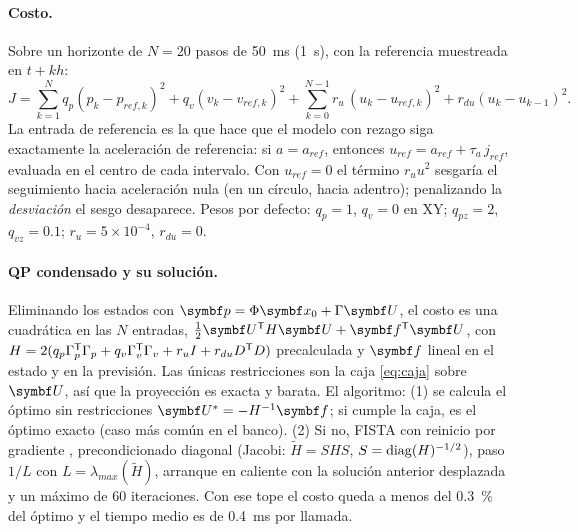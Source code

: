 \paragraph{Costo.} Sobre un horizonte de $N=20$ pasos de 50~ms (1~s), con la
referencia muestreada en $t+kh$:
\begin{equation}
J=\sum_{k=1}^{N}q_p(p_k-p_{ref,k})^2+q_v(v_k-v_{ref,k})^2
+\sum_{k=0}^{N-1}r_u\,(u_k-u_{ref,k})^2+r_{du}(u_k-u_{k-1})^2 .
\label{eq:mpc_cost}
\end{equation}
La entrada de referencia es la que hace que el modelo con rezago siga
exactamente la aceleración de referencia: si $a=a_{ref}$, entonces
$u_{ref}=a_{ref}+\tau_a\,j_{ref}$, evaluada en el centro de cada intervalo.
Con $u_{ref}=0$ el término $r_uu^2$ sesgaría el seguimiento hacia
aceleración nula (en un círculo, hacia adentro); penalizando la
\emph{desviación} el sesgo desaparece. Pesos por defecto: $q_p=1$, $q_v=0$
en XY; $q_{pz}=2$, $q_{vz}=0.1$; $r_u=5\times10^{-4}$, $r_{du}=0$.

\paragraph{QP condensado y su solución.} Eliminando los estados con
$\vect p=\Phi\vect x_0+\Gamma\vect U$, el costo es una cuadrática en las $N$
entradas, $\tfrac12\vect U\T H\vect U+\vect f\T\vect U$, con
$H=2(q_p\Gamma_p^{\mathsf{T}}\Gamma_p+q_v\Gamma_v^{\mathsf{T}}\Gamma_v+r_uI+r_{du}D^{\mathsf{T}} D)$ precalculada y
$\vect f$ lineal en el estado y en la previsión. Las únicas restricciones son
la caja \eqref{eq:caja} sobre $\vect U$, así que la proyección es exacta y
barata. El algoritmo: (1) se calcula el óptimo sin restricciones
$\vect U^*=-H^{-1}\vect f$; si cumple la caja, es el óptimo exacto (caso más
común en el banco). (2) Si no, FISTA \cite{beck09} con reinicio por
gradiente \cite{odonoghue15}, precondicionado diagonal (Jacobi:
$\tilde H=SHS$, $S=\operatorname{diag}(H)^{-1/2}$), paso $1/L$ con $L=\lambda_{max}(\tilde H)$,
arranque en caliente con la solución anterior desplazada y un máximo de 60
iteraciones. Con ese tope el costo queda a menos del 0.3~\% del óptimo y el
tiempo medio es de 0.4~ms por llamada.

